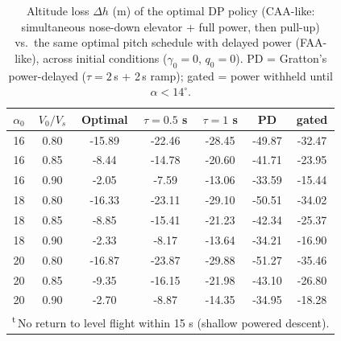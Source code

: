\begin{table}[hbt!]
    \centering
    \caption{Altitude loss $\Delta h$ (m) of the optimal DP policy (CAA-like:
    simultaneous nose-down elevator + full power, then pull-up) vs.\ the same
    optimal pitch schedule with delayed power (FAA-like), across initial
    conditions ($\gamma_0=0$, $q_0=0$). PD = Gratton's power-delayed
    ($\tau=2$\,s + 2\,s ramp); gated = power withheld until $\alpha<14^\circ$.}
    \label{tab:caa_vs_faa}
    \begin{tabular}{ccccccc}
        \hline
        $\alpha_0$ & $V_0/V_s$ & Optimal & $\tau{=}0.5$ s & $\tau{=}1$ s & PD & gated \\
        \hline
        16 & 0.80 & -15.89 & -22.46 & -28.45 & -49.87 & -32.47 \\
        16 & 0.85 & -8.44 & -14.78 & -20.60 & -41.71 & -23.95 \\
        16 & 0.90 & -2.05 & -7.59 & -13.06 & -33.59 & -15.44 \\
        18 & 0.80 & -16.33 & -23.11 & -29.10 & -50.51 & -34.02 \\
        18 & 0.85 & -8.85 & -15.41 & -21.23 & -42.34 & -25.37 \\
        18 & 0.90 & -2.33 & -8.17 & -13.64 & -34.21 & -16.90 \\
        20 & 0.80 & -16.87 & -23.87 & -29.88 & -51.27 & -35.46 \\
        20 & 0.85 & -9.35 & -16.15 & -21.98 & -43.10 & -26.80 \\
        20 & 0.90 & -2.70 & -8.87 & -14.35 & -34.95 & -18.28 \\
        \hline
        \multicolumn{7}{l}{\footnotesize\textsuperscript{t}\,No return to level flight within 15 s (shallow powered descent).}\\
    \end{tabular}
\end{table}

